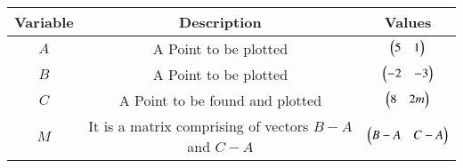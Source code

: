 \begin{center}
    \begin{tabular}{|c|c|c|} 
        \hline
            \textbf{Variable} & \textbf{Description} & \textbf{Values} \\ 
        \hline
            $A$   & A Point to be plotted & $\begin{pmatrix}5 & 1\end{pmatrix}$\\ 
        \hline
            $B$   & A Point to be plotted & $\begin{pmatrix}-2 & -3\end{pmatrix}$\\ 
        \hline
            $C$   & A Point to be found and plotted & $\begin{pmatrix}8 & 2m\end{pmatrix}$\\ 
        \hline
            $M$   & It is a matrix comprising of vectors $B-A$ and $C-A$ & $\begin{pmatrix}B-A & C-A\end{pmatrix}$\\ 
        \hline
    \end{tabular}
\end{center}  



